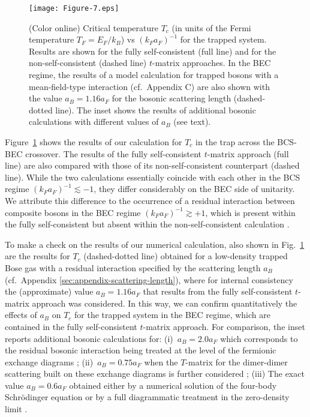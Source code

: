 \documentclass[pra,twocolumn,aps,amssymb,showpacs,superscriptaddress]{revtex4-1}
\begin{document}
\begin{figure}[t]
\begin{center}
\texttt{[image: Figure-7.eps]}
\caption{(Color online) Critical temperature $T_{c}$ (in units of the Fermi temperature $T_{F} = E_{F}/k_{B}$) vs $(k_{F} a_{F})^{-1}$ for the trapped system.
                                    Results are shown for the fully self-consistent (full line) and for the non-self-consistent (dashed line) $t$-matrix approaches.
                                    In the BEC regime, the results of a model calculation for trapped bosons with a mean-field-type interaction (cf.~Appendix C) are also shown with the value $a_{B} = 1.16 a_{F}$
                                    for the bosonic scattering length (dashed-dotted line).
                                    The inset shows the results of additional bosonic calculations with different values of $a_{B}$ (see text).}
\label{Figure-7}
\end{center}
\end{figure} 


Figure~\ref{Figure-7} shows the results of our calculation for $T_{c}$ in the trap across the BCS-BEC crossover.
The results of the fully self-consistent $t$-matrix approach (full line) are also compared with those of its non-self-consistent counterpart (dashed line).
While the two calculations essentially coincide with each other in the BCS regime $(k_{F} a_{F})^{-1} \lesssim -1$, they differ considerably on the BEC side of unitarity.
We attribute this difference to the occurrence of a residual interaction between composite bosons in the BEC regime $(k_{F} a_{F})^{-1} \gtrsim +1$, which is present within the fully self-consistent 
but absent within the non-self-consistent calculation \cite{PPS-2019}.

To make a check on the results of our numerical calculation, also shown in Fig.~\ref{Figure-7} are the results for $T_{c}$ (dashed-dotted line) 
obtained for a low-density trapped Bose gas with a residual interaction specified by the scattering length $a_{B}$ (cf.~Appendix \ref{sec:appendix-scattering-length}), where for internal consistency
the (approximate) value $a_{B} = 1.16 a_{F}$ that results from the fully self-consistent $t$-matrix approach \cite{PPS-2019} was considered.
In this way, we can confirm quantitatively the effects of $a_{B}$ on $T_{c}$ for the trapped system in the BEC regime, which are contained in the fully self-consistent $t$-matrix approach.
For comparison, the inset reports additional bosonic calculations for: (i)~$a_{B} = 2.0 a_{F}$ which corresponds to the residual bosonic interaction being treated at the level of the fermionic exchange diagrams \cite{PS-2000}; (ii)~$a_{B} = 0.75 a_{F}$ when the $T$-matrix for the dimer-dimer scattering built on these exchange diagrams is further considered \cite{PS-2000}; (iii) The exact value $a_{B} = 0.6 a_{F}$ obtained either by a numerical solution of the four-body Schr\"{o}dinger equation \cite{Petrov-2005} or by a full diagrammatic treatment in the zero-density limit \cite{Brodsky-2006}.
\end{document}
